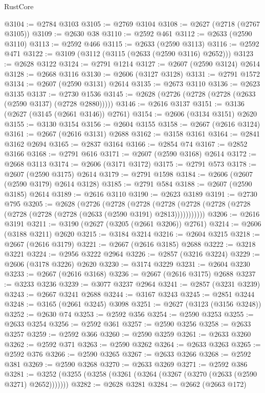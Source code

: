 \begin{lexlean}{RustCore}
\begin{coremodule}
@3104 := @2784 @3103
@3105 := @2769 @3104
@3108 := @2627 (@2718 (@2767 @3105))
@3109 := @2630 @38
@3110 := @2592 @461
@3112 := @2633 (@2590 @3110)
@3113 := @2592 @466
@3115 := @2633 (@2590 @3113)
@3116 := @2592 @471
@3122 := @3109 (@3112 (@3115 (@2633 (@2590 @3116) @2652)))
@3123 := @2628 @3122
@3124 := @2791 @1214
@3127 := @2607 (@2590 @3124) @2614
@3128 := @2668 @3116
@3130 := @2606 (@3127 @3128)
@3131 := @2791 @1572
@3134 := @2607 (@2590 @3131) @2614
@3135 := @2673 @3110
@3136 := @2623 @3135
@3137 := @2730 @1536
@3145 := @2628 (@2726 (@2728 (@2728 (@2633 (@2590 @3137) (@2728 @2880)))))
@3146 := @2616 @3137
@3151 := @3136 (@2627 (@3145 (@2661 @3146)) @2761)
@3154 := @2606 (@3134 @3151) @2620
@3155 := @3130 @3154
@3156 := @2604 @3155
@3158 := @2667 (@2616 @3124)
@3161 := @2667 (@2616 @3131) @2688
@3162 := @3158 @3161
@3164 := @2841 @3162 @2694
@3165 := @2837 @3164
@3166 := @2854 @74
@3167 := @2852 @3166
@3168 := @2791 @616
@3171 := @2607 (@2590 @3168) @2614
@3172 := @2668 @3113
@3174 := @2606 (@3171 @3172)
@3175 := @2791 @573
@3178 := @2607 (@2590 @3175) @2614
@3179 := @2791 @1598
@3184 := @2606 (@2607 (@2590 @3179) @2614 @3128)
@3185 := @2791 @584
@3188 := @2607 (@2590 @3185) @2614
@3189 := @2616 @3110
@3190 := @2623 @3189
@3191 := @2730 @795
@3205 := @2628
    (@2726
      (@2728
        (@2728
          (@2728 (@2728 (@2728 (@2728 (@2728 (@2728 (@2728 (@2633 (@2590 @3191) @2813)))))))))))
@3206 := @2616 @3191
@3211 := @3190 (@2627 (@3205 (@2661 @3206)) @2761)
@3214 := @2606 (@3188 @3211) @2620
@3215 := @3184 @3214
@3216 := @2604 @3215
@3218 := @2667 (@2616 @3179)
@3221 := @2667 (@2616 @3185) @2688
@3222 := @3218 @3221
@3224 := @2956 @3222 @2964
@3226 := @2857 (@3216 @3224)
@3229 := @2606 (@3178 @3226) @2620
@3230 := @3174 @3229
@3231 := @2604 @3230
@3233 := @2667 (@2616 @3168)
@3236 := @2667 (@2616 @3175) @2688
@3237 := @3233 @3236
@3239 := @3077 @3237 @2964
@3241 := @2857 (@3231 @3239)
@3243 := @2667 @3241 @2688
@3244 := @3167 @3243
@3245 := @2851 @3244
@3248 := @3165 (@2661 @3245) @3098
@3251 := @2627 (@3123 (@3156 @3248))
@3252 := @2630 @74
@3253 := @2592 @356
@3254 := @2590 @3253
@3255 := @2633 @3254
@3256 := @2592 @361
@3257 := @2590 @3256
@3258 := @2633 @3257
@3259 := @2592 @366
@3260 := @2590 @3259
@3261 := @2633 @3260
@3262 := @2592 @371
@3263 := @2590 @3262
@3264 := @2633 @3263
@3265 := @2592 @376
@3266 := @2590 @3265
@3267 := @2633 @3266
@3268 := @2592 @381
@3269 := @2590 @3268
@3270 := @2633 @3269
@3271 := @2592 @386
@3281 := @3252 (@3255 (@3258 (@3261 (@3264 (@3267 (@3270 (@2633 (@2590 @3271) @2652)))))))
@3282 := @2628 @3281
@3284 := @2662 (@2663 @172)

\end{coremodule}
\end{lexlean}
